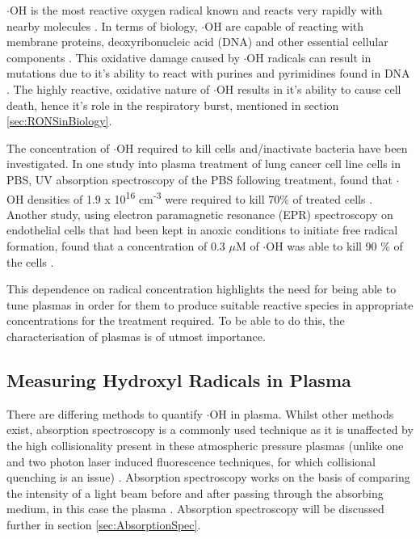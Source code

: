 \documentclass[11pt, oneside]{article}   	%
\begin{document}
$\cdot$OH is the most reactive oxygen radical known and reacts very rapidly with nearby molecules \cite{Halliwell2007}. 
In terms of biology, $\cdot$OH are capable of reacting with membrane proteins, deoxyribonucleic acid (DNA) and other essential cellular components \cite{Block2001}.
This oxidative damage caused by $\cdot$OH radicals can result in mutations due to it's ability to react with purines and pyrimidines found in DNA \cite{Dizdaroglu2012oxidatively}. 
The highly reactive, oxidative nature of $\cdot$OH results in it's ability to cause cell death, hence it's role in the respiratory burst, mentioned in section \ref{sec:RONSinBiology}.

The concentration of $\cdot$OH required to kill cells and/inactivate bacteria have been investigated.
In one study into plasma treatment of lung cancer cell line cells in PBS, UV absorption spectroscopy of the PBS following treatment, found that $\cdot$OH densities of 1.9 x 10\textsuperscript{16} cm\textsuperscript{-3} were required to kill 70\% of treated cells \cite{Attri2015}.
Another study, using electron paramagnetic resonance (EPR) spectroscopy on endothelial cells that had been kept in anoxic conditions to initiate free radical formation, found that a concentration of 0.3 $\mu$M of $\cdot$OH was able to kill 90 \% of the cells \cite{Zweier1988}.

This dependence on radical concentration highlights the need for being able to tune plasmas in order for them to produce suitable reactive species in appropriate concentrations for the treatment required.
To be able to do this, the characterisation of plasmas is of utmost importance.

\subsection{Measuring Hydroxyl Radicals in Plasma}

There are differing methods to quantify $\cdot$OH in plasma.
Whilst other methods exist, absorption spectroscopy is a commonly used technique as it is unaffected by the high collisionality present in these atmospheric pressure plasmas (unlike one and two photon laser induced fluorescence techniques, for which collisional quenching is an issue) \cite{Schroter2015atomic, BruggemanCS2012}.
Absorption spectroscopy works on the basis of comparing the intensity of a light beam before and after passing through the absorbing medium, in this case the plasma \cite{Reuter2015}.
Absorption spectroscopy will be discussed further in section \ref{sec:AbsorptionSpec}.
\end{document}
